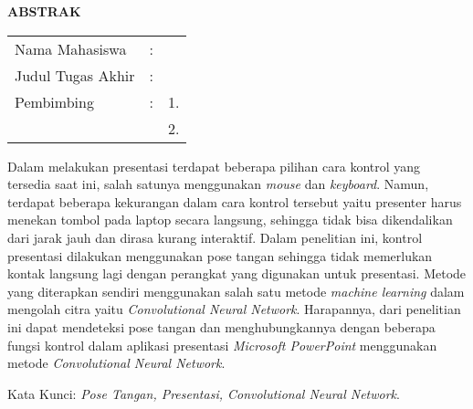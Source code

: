 \begin{center}
  \large\textbf{ABSTRAK}
\end{center}


\vspace{2ex}

\begingroup
\setlength{\tabcolsep}{0pt}

\noindent
\begin{tabularx}{\textwidth}{l >{\centering}m{2em} X}
  Nama Mahasiswa    & : & \name{}         \\

  Judul Tugas Akhir & : & \tatitle{}      \\

  Pembimbing        & : & 1. \advisor{}   \\
                    &   & 2. \coadvisor{} \\
\end{tabularx}
\endgroup

Dalam melakukan presentasi terdapat beberapa pilihan cara kontrol yang tersedia saat ini, salah satunya menggunakan \emph{mouse} dan \emph{keyboard}. Namun, terdapat beberapa kekurangan dalam cara kontrol tersebut yaitu presenter harus menekan tombol pada laptop secara langsung, sehingga tidak bisa dikendalikan dari jarak jauh dan dirasa kurang interaktif. Dalam penelitian ini, kontrol presentasi dilakukan menggunakan pose tangan sehingga tidak memerlukan kontak langsung lagi dengan perangkat yang digunakan untuk presentasi. Metode yang diterapkan sendiri menggunakan salah satu metode \emph{machine learning} dalam mengolah citra yaitu \emph{Convolutional Neural Network}. Harapannya, dari penelitian ini dapat mendeteksi pose tangan dan menghubungkannya dengan beberapa fungsi kontrol dalam aplikasi presentasi \emph{Microsoft PowerPoint} menggunakan metode \emph{Convolutional Neural Network}.

Kata Kunci: \emph{Pose Tangan, Presentasi, Convolutional Neural Network}.
